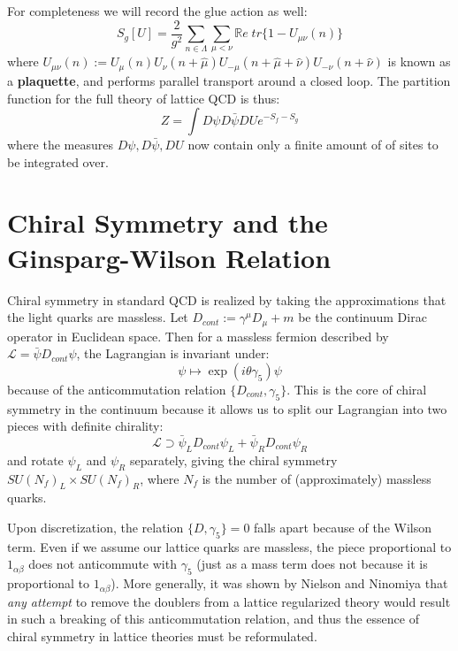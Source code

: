 \documentclass[11pt, oneside]{article}   	%
\theoremstyle{definition}
\begin{document}
For completeness we will record the glue action as well:
\begin{equation}
	S_{g}[U] = \frac{2}{g^2}\sum_{n\in\Lambda}\sum_{\mu < \nu}\mathbb Re\; tr\{1 - U_{\mu\nu}(n)\}
\end{equation}
where $U_{\mu\nu}(n) := U_\mu(n) U_\nu(n + \hat\mu) U_{-\mu}(n + \hat\mu + \hat\nu) U_{-\nu}(n + \hat\nu)$ is known as a \textbf{plaquette}, 
and performs parallel transport around a closed loop. The partition function for the full theory of lattice QCD is thus:
\begin{equation}
	Z = \int D\psi D\bar\psi D U e^{-S_f - S_g}
\end{equation}
where the measures $D\psi, D\bar\psi, DU$ now contain only a finite amount of of sites to be integrated over. 

\section{Chiral Symmetry and the Ginsparg-Wilson Relation}

Chiral symmetry in standard QCD is realized by taking the approximations that the light quarks are massless. Let $D_{cont} := \gamma^\mu D_\mu + m$ be the continuum 
Dirac operator in Euclidean space. Then for a massless fermion described by $\mathcal L = \bar\psi D_{cont}\psi$, the Lagrangian is invariant under:
\begin{equation}
	\psi\mapsto \exp(i\theta\gamma_5)\psi
\end{equation}
because of the anticommutation relation $\{D_{cont}, \gamma_5\}$. This is the core of chiral symmetry in the continuum because it allows us to split our Lagrangian 
into two pieces with definite chirality:
\begin{equation}
	\mathcal L\supset \bar\psi_L D_{cont}\psi_L + \bar\psi_R D_{cont}\psi_R
\end{equation}
and rotate $\psi_L$ and $\psi_R$ separately, giving the chiral symmetry $SU(N_f)_L\times SU(N_f)_R$, where $N_f$ is the number of (approximately) massless quarks. 

Upon discretization, the relation $\{D, \gamma_5\} = 0$ falls apart because of the Wilson term. Even if we assume our lattice quarks are massless, the piece proportional to 
$1_{\alpha\beta}$ does not anticommute with $\gamma_5$ (just as a mass term does not because it is proportional to $1_{\alpha\beta}$). More generally, it was shown by 
Nielson and Ninomiya \cite{nogo} that \textit{any attempt} to remove the doublers from a lattice regularized theory would result in such a breaking of this anticommutation 
relation, and thus the essence of chiral symmetry in lattice theories must be reformulated. 
\end{document}
